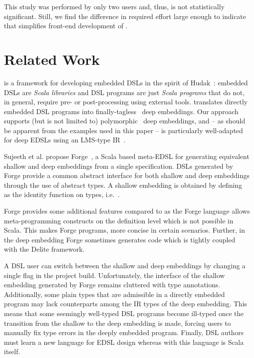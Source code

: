 This study was performed by only two users and, thus, is not statistically
significant. Still, we find the difference in required effort large enough to indicate that \yy
simplifies front-end development of \edsls.


\chapter{Related Work}
\label{sec:related-work}

\yy is a framework for developing embedded DSLs in the spirit of
Hudak~\cite{Hudak96csur,Hudak98sr}: embedded DSLs are \emph{Scala
  libraries} and DSL programs are just \emph{Scala programs} that do
not, in general, require pre- or post-processing using external tools.
\yy translates directly embedded DSL programs into
finally-tagless~\cite{carette_finally_2009} deep embeddings.  Our
approach supports (but is not limited to)
polymorphic~\cite{hofer_polymorphic_2008} deep embeddings, and -- as
should be apparent from the examples used in this paper -- is
particularly well-adapted for deep EDSLs using an LMS-type
IR~\cite{rompf_scala-virtualized:_2009,rompf_optimizing_2013}.

Sujeeth et al. propose Forge~\cite{forge}, a Scala based meta-EDSL for generating equivalent
shallow and deep embeddings from a single specification.  DSLs
generated by Forge provide a common abstract interface for both
shallow and deep embeddings through the use of abstract 
types.  A shallow embedding is obtained by defining  as the
identity function on types, i.e.\ .

Forge provides some additional features compared to \yy as the Forge language allows meta-programming
 constructs on the definition level which is not possible in Scala. This makes Forge programs, more
 concise in certain scenarios. Further, in the deep embedding
 Forge sometimes generates code which is tightly coupled with the Delite framework.

A DSL user can switch between the shallow and deep embeddings by
changing a single flag in the project build. Unfortunately, the interface of the shallow
embedding generated by Forge remains cluttered with  type
annotations. Additionally, some plain types that are admissible in a
directly embedded program may lack counterparts among the IR types of
the deep embedding.  This means that some seemingly well-typed DSL
programs become ill-typed once the transition from the shallow to the
deep embedding is made, forcing users to manually fix type errors in
the deeply embedded program. Finally, DSL authors must learn a new
language for EDSL design whereas with \yy this language is Scala
itself.

